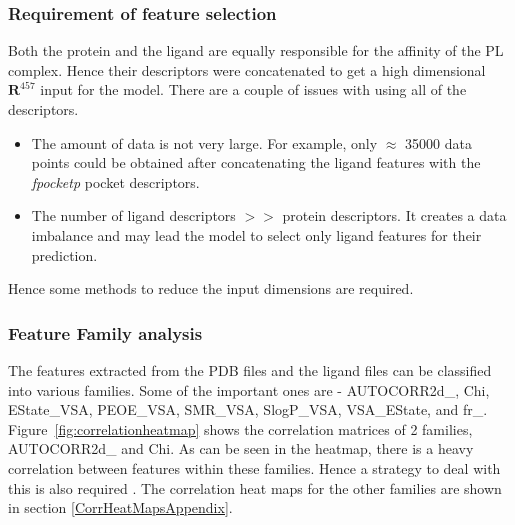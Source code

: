 \documentclass[11pt]{article}
\begin{document}
\subsubsection{Requirement of feature selection}
Both the protein and the ligand are equally responsible for the affinity of the PL complex.
Hence their descriptors were concatenated to get a high dimensional $\mathbf{R}^{457}$ input for the model.
There are a couple of issues with using all of the descriptors.
\begin{itemize}
\item The amount of data is not very large. 
For example,  only $\approx$ 35000 data points could be obtained after concatenating the ligand features with the \textit{fpocketp} pocket descriptors.
\item The number of ligand descriptors $>>$ protein descriptors.
It creates a data imbalance and may lead the model to select only ligand features for their prediction.
\end{itemize}
Hence some methods to reduce the input dimensions are required.

\subsubsection{Feature Family analysis}
\label{CorrelationAnalysis}
The features extracted from the PDB files and the ligand files can be classified into various families.
Some of the important ones are - AUTOCORR2d\_, Chi, EState\_VSA,  PEOE\_VSA,  SMR\_VSA,  SlogP\_VSA,  VSA\_EState, and fr\_.
Figure~\ref{fig:correlationheatmap} shows the correlation matrices of 2 families, AUTOCORR2d\_ and Chi.
As can be seen in the heatmap, there is a heavy correlation between features within these families.
Hence a strategy to deal with this is also required \cite{collinearityissueindifferentliterature}.
The correlation heat maps for the other families are shown in section \ref{CorrHeatMapsAppendix}.
\end{document}
